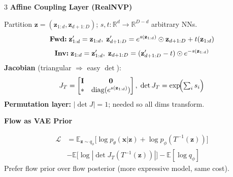 \documentclass[8pt,a4paper]{extarticle}
\newcommand{\sub}[1]{%
  \vspace{1pt}%
  {\footnotesize\textbf{#1}}%
  \vspace{0.5pt}%
}
\newcommand{\E}{\mathbb{E}}
\newcommand{\ELBO}{\mathcal{L}}
\newcommand{\R}{\mathbb{R}}
\newcommand{\bx}{\mathbf{x}}
\newcommand{\bz}{\mathbf{z}}
\begin{document}
\begin{multicols}{3}
\sub{Affine Coupling Layer (RealNVP)}

Partition $\bz=(\bz_{1:d},\bz_{d+1:D})$;\; $s,t:\R^d\!\to\!\R^{D-d}$ arbitrary NNs.
\[
  \text{\textbf{Fwd:}}\;\bz'_{1:d}=\bz_{1:d},\;\bz'_{d+1:D}=e^{s(\bz_{1:d})}\odot\bz_{d+1:D}+t(\bz_{1:d})
\]
\[
  \text{\textbf{Inv:}}\;\bz_{1:d}=\bz'_{1:d},\;\bz_{d+1:D}=(\bz'_{d+1:D}-t)\odot e^{-s(\bz_{1:d})}
\]
\textbf{Jacobian} (triangular $\Rightarrow$ easy $\det$):
\[
  J_T=\begin{bmatrix}\mathbf{I}&\mathbf{0}\\\ast&\mathrm{diag}(e^{s(\bz_{1:d})})\end{bmatrix},\;
  \det J_T=\exp\!\Bigl(\textstyle\sum_i s_i\Bigr)
\]
\textbf{Permutation layer:} $|\det J|=1$; needed so all dims transform.

\sub{Flow as VAE Prior}

\begin{align*}
  \ELBO &= \E_{\bz\sim q_\phi}\bigl[\log p_\theta(\bx|\bz)
         +\log p_\phi(T^{-1}(\bz))\bigr]\\
        &-\E\bigl[\log|\det J_T(T^{-1}(\bz))|\bigr]
         -\E[\log q_\phi]
\end{align*}
Prefer flow prior over flow posterior (more expressive model, same cost).

\end{multicols}

\newpage
\end{document}
